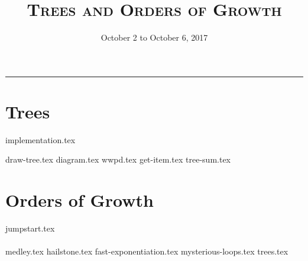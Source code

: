 \documentclass{exam}
\title{\textsc{Trees and Orders of Growth}}
\date{October 2 to October 6, 2017}
\begin{document}
\maketitle
\rule{\textwidth}{0.15em}
\fontsize{12}{15}\selectfont



\section{Trees}
{implementation.tex}
\begin{questions}
{draw-tree.tex}
{diagram.tex}
{wwpd.tex}
{get-item.tex}
{tree-sum.tex}

\section{Orders of Growth}
{jumpstart.tex}
\\\\
{medley.tex}
{hailstone.tex}
{fast-exponentiation.tex}
{mysterious-loops.tex}
{trees.tex}



\end{questions}
\end{document}
